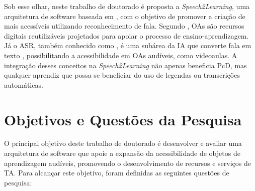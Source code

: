 Sob esse olhar, neste trabalho de doutorado é proposta a \textit{Speech2Learning}, uma arquitetura de software baseada em , com o objetivo de promover a criação de  mais acessíveis utilizando reconhecimento de fala. Segundo , OAs são recursos digitais reutilizáveis projetados para apoiar o processo de ensino-aprendizagem. Já o ASR, também conhecido como , é uma subárea da IA que converte fala em texto \cite{Jurafsky2024}, possibilitando a acessibilidade em OAs audíveis, como videoaulas. A integração desses conceitos na \textit{Speech2Learning} não apenas beneficia PcD, mas qualquer aprendiz que possa se beneficiar do uso de legendas ou transcrições automáticas.

\section{Objetivos e Questões da Pesquisa}

O principal objetivo deste trabalho de doutorado é desenvolver e avaliar uma arquitetura de software que apoie a expansão da acessibilidade de objetos de aprendizagem audíveis, promovendo o desenvolvimento de recursos e serviços de TA. Para alcançar este objetivo, foram definidas as seguintes questões de pesquisa:


